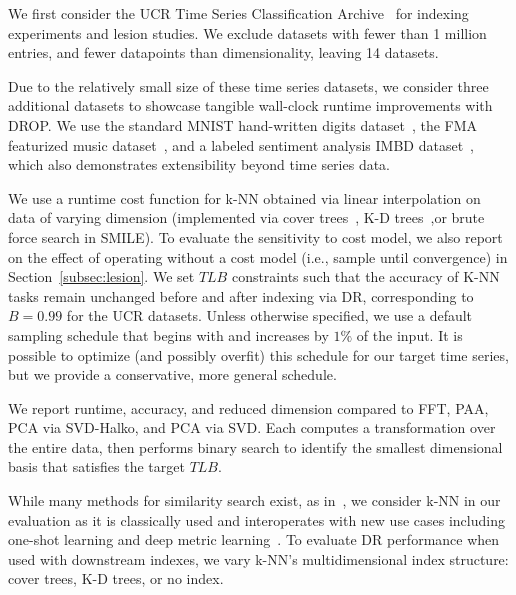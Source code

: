 We first consider the UCR Time Series Classification Archive~\cite{ucr} for indexing experiments and lesion studies. 
We exclude datasets with fewer than 1 million entries, and fewer datapoints than dimensionality, leaving 14 datasets. 

Due to the relatively small size of these time series datasets, we consider three additional datasets to showcase tangible wall-clock runtime improvements with DROP.
We use the standard MNIST hand-written digits dataset~\cite{mnist}, the FMA featurized music dataset~\cite{fma}, and a labeled sentiment analysis IMBD dataset~\cite{imdb}, which also demonstrates extensibility beyond time series data. 

 We use a runtime cost function for k-NN obtained via linear interpolation on data of varying dimension (implemented via cover trees~\cite{ctree}, K-D trees~\cite{kdtree},or brute force search in SMILE).
To evaluate the sensitivity to cost model, we also report on the effect of operating without a cost model (i.e., sample until convergence) in Section~\ref{subsec:lesion}.
We set $TLB$ constraints such that the accuracy of K-NN tasks remain unchanged before and after indexing via DR, corresponding to $B = 0.99$  for the UCR datasets.
Unless otherwise specified, we use a default sampling schedule that begins with and increases by $1\%$ of the input.
It is possible to optimize (and possibly overfit) this schedule for our target time series, but we provide a conservative, more general schedule.

 We report runtime, accuracy, and reduced dimension compared to FFT, PAA, PCA via SVD-Halko, and PCA via SVD. 
Each computes a transformation over the entire data, then performs binary search to identify the smallest dimensional basis that satisfies the target $TLB$. 

While many methods for similarity search exist, as in~\cite{keogh-study}, we consider k-NN in our evaluation as it is classically used and  interoperates with new use cases including one-shot learning and deep metric learning~\cite{knn1, knn2, knn3}.
To evaluate DR performance when used with downstream indexes, we vary k-NN's multidimensional index structure: cover trees, K-D trees, or no index. 

